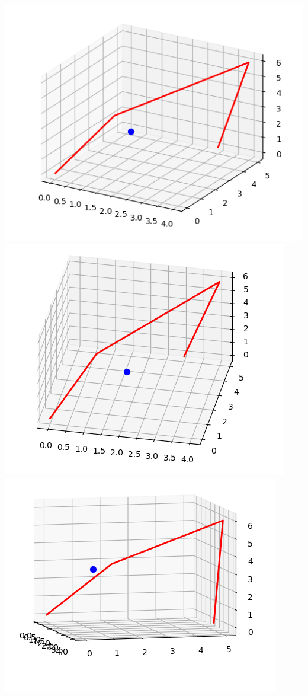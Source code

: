 \documentclass[11pt,class=report,crop=false]{standalone}
\begin{document}
\begin{cours}
\begin{center}
	\includegraphics[scale=\myscale,scale=0.3]{ecran-images3d-cours1}
	\includegraphics[scale=\myscale,scale=0.3]{ecran-images3d-cours2}
	\includegraphics[scale=\myscale,scale=0.3]{ecran-images3d-cours3}	
\end{center}


\end{cours}
\end{document}
